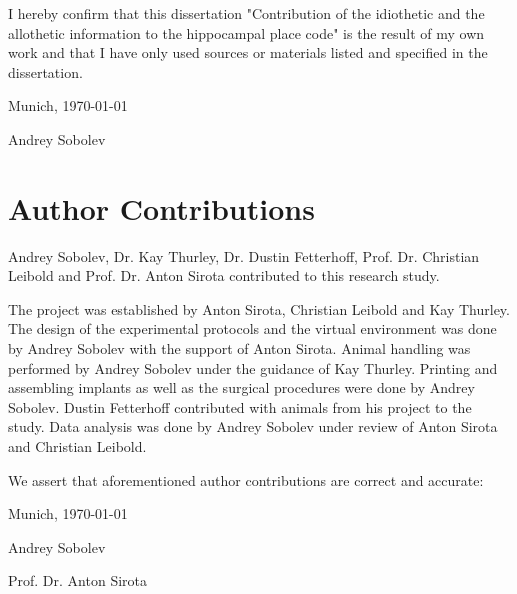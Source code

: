 I hereby confirm that this dissertation "Contribution of the idiothetic and the allothetic information to the hippocampal place code" is the result of my own work and that I have only used sources or materials listed and specified in the dissertation.


\vspace{0.3in}

\noindent Munich, \today

\vspace{1in}

\noindent Andrey Sobolev


\chapter{Author Contributions}
Andrey Sobolev, Dr. Kay Thurley, Dr. Dustin Fetterhoff, Prof. Dr. Christian Leibold and Prof. Dr. Anton Sirota contributed to this research study.

The project was established by Anton Sirota, Christian Leibold and Kay Thurley. The design of the experimental protocols and the virtual environment was done by Andrey Sobolev with the support of Anton Sirota. Animal handling was performed by Andrey Sobolev under the guidance of Kay Thurley. Printing and assembling implants as well as the surgical procedures were done by Andrey Sobolev. Dustin Fetterhoff contributed with animals from his project to the study. Data analysis was done by Andrey Sobolev under review of Anton Sirota and Christian Leibold.

We assert that aforementioned author contributions are correct and accurate:

\vspace{0.3in}

\noindent Munich, \today

\vspace{0.8in}

\noindent Andrey Sobolev

\vspace{0.8in}

\noindent Prof. Dr. Anton Sirota
